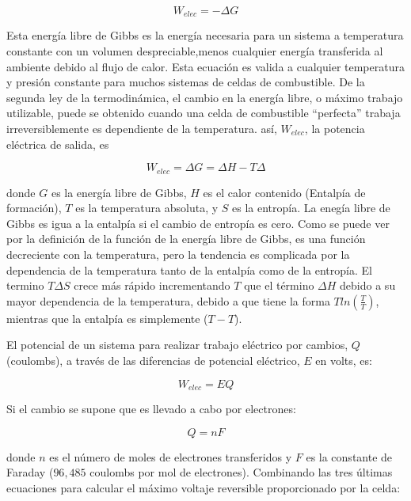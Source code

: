 \documentclass[12pt]{book}
\theoremstyle{definition}
\theoremstyle{remark}
\theoremstyle{plain}
\begin{document}
\begin{equation}
 \label{equ335}
W_{elec}=- \Delta G
\end{equation}
 
Esta energía libre de Gibbs es la energía necesaria para un sistema a temperatura
constante con un volumen despreciable,menos cualquier energía transferida al 
ambiente debido al flujo de calor. Esta ecuación es valida a cualquier temperatura 
y presión constante para muchos sistemas de celdas de combustible. De la segunda ley
de la termodinámica, el cambio en la energía libre, o máximo trabajo utilizable,
puede se obtenido cuando una celda de combustible ``perfecta'' trabaja irreversiblemente
es dependiente de la temperatura. así, $W_{elec}$,  la potencia eléctrica de salida, es

\begin{equation}
 \label{equ336}
W_{elec}= \Delta G = \Delta H - T \Delta
\end{equation}

donde $G$ es la energía libre de Gibbs, $H$ es el calor contenido (Entalpía de 
formación), $T$ es la temperatura absoluta, y $S$ es la entropía. La enegía libre 
de Gibbs es igua a la entalpía si el cambio de entropía es cero. Como se puede ver 
por la definición de la función de la energía libre de Gibbs, es una función 
decreciente con la temperatura,  pero la tendencia es complicada por la dependencia
de la temperatura tanto de la entalpía como de la entropía. El termino $T \Delta S$ 
crece más rápido incrementando $T$ que el término $\Delta H$ debido a su mayor dependencia
de la temperatura, debido a que tiene la forma $T ln (\frac{T}{T})$, mientras que
la entalpía es simplemente ($T-T$). 

El potencial de un sistema para realizar trabajo eléctrico por cambios, $Q$ (coulombs),
a través de las diferencias de potencial eléctrico, $E$ en volts, es:

\begin{equation}
 \label{equ337}
W_{elec}= E Q
\end{equation}

Si el cambio se supone que es llevado a cabo por electrones:

\begin{equation}
 \label{equ338}
Q = n F
\end{equation}
 
donde $n$ es el número de moles de electrones transferidos y $F$ es la constante
de Faraday ($96, 485$ coulombs por mol de electrones). Combinando las tres últimas
ecuaciones para calcular el máximo voltaje reversible proporcionado por la celda:
\end{document}
